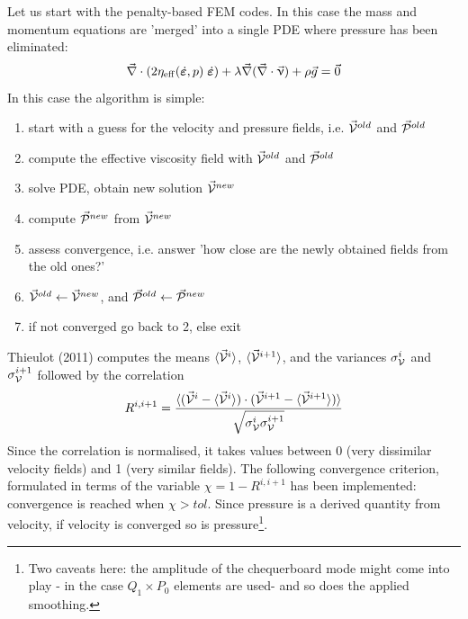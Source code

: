 Let us start with the penalty-based FEM codes. In this case the mass and momentum 
equations are 'merged' into a single PDE where pressure has been eliminated:
\[
\vec\nabla\cdot (2 \eta_{\rm eff}(\dot{\bm\varepsilon},p) \;  \dot{\bm\varepsilon}) 
+\lambda \vec\nabla (\vec\nabla \cdot \vec\upnu) + \rho \vec{g} = \vec{0} 
\]
In this case the algorithm is simple:
\begin{enumerate}
\item start with a guess for the velocity and pressure fields, i.e. $\vec{\cal V}^{old}$ 
and $\vec{\cal P}^{old}$
\item compute the effective viscosity field with $\vec{\cal V}^{old}$ and $\vec{\cal P}^{old}$
\item solve PDE, obtain new solution $\vec{\cal V}^{new}$ 
\item compute $\vec{\cal P}^{new}$ from $\vec{\cal V}^{new}$
\item assess convergence, i.e. answer 'how close are the newly obtained fields from the old ones?'
\item $\vec{\cal V}^{old} \leftarrow \vec{\cal V}^{new}$, and $\vec{\cal P}^{old} \leftarrow \vec{\cal P}^{new}$
\item if not converged go back to 2, else exit
\end{enumerate}

Thieulot (2011) \cite{thie11} computes the means
$\langle \vec{\cal V}^i\rangle$, 
$\langle \vec{\cal V}^{i+1}\rangle$, 
and the variances 
$\sigma_{\cal V}^i$ and 
$\sigma_{\cal V}^{i+1}$ 
followed by the correlation 
\[
R^{i,i+1} = \frac{\langle (\vec{\cal V}^i - \langle \vec{\cal V}^i\rangle)
\cdot ( \vec{\cal V}^{i+1} - \langle \vec{\cal V}^{i+1}\rangle) \rangle }
{\sqrt{\sigma_{\cal V}^i \sigma_{\cal V}^{i+1}}}
\]
Since the correlation is normalised, it takes values between 0
(very dissimilar velocity fields) and 1 (very similar fields). The
following convergence criterion, formulated in terms of the variable $\chi = 1 -R^{i,i+1} $
has been implemented: convergence is reached when $\chi>tol$.
Since pressure is a derived quantity from velocity, if velocity is converged so is 
pressure\footnote{Two caveats here: the amplitude of the chequerboard mode
might come into play - in the case $Q_1\times P_0$ elements are used- and so does the applied smoothing.}.

